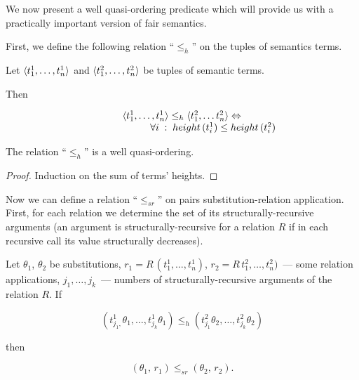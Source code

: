 We now present a well quasi-ordering predicate which will provide us with a practically important version of fair semantics. 


First, we define the following relation ``$\leq_h$'' on the tuples of semantics terms.

\begin{definition}
  Let $\langle t_1^1, \dots, t_n^1 \rangle$ and $\langle t_1^2, \dots, t_n^2 \rangle$ be tuples of semantic terms. 

  Then

  \[
  \begin{array}{c}
  \langle t_1^1, \ldots, t_n^1 \rangle \leq_h \langle t_1^2, \ldots t_n^2 \rangle \Leftrightarrow\\
  \phantom{XXXXXXX}\forall i\;:\;height\,(t_i^1) \leq height\,(t_i^2)
  \end{array}
  \]
\end{definition}


\begin{lemma}
\label{lemma:wqo1}
The relation ``$\leq_h$'' is a well quasi-ordering.
\end{lemma}
\begin{proof}
  Induction on the sum of terms' heights.
\end{proof}

Now we can define a relation ``$\leq_{sr}$'' on pairs substitution-relation application. First, for each relation we
determine the set of its structurally-recursive arguments (an argument is structurally-recursive for a relation $R$ if in
each recursive call its value structurally decreases). 

\begin{definition}
  Let $\theta_1$, $\theta_2$ be substitutions, \mbox{$r_1=R\,(t^1_1,\dots,t^1_n)$}, \mbox{$r_2=R\,t^2_1,\dots,t^2_n)$}~--- some relation applications, $j_1, \dots, j_k$~---
  numbers of structurally-recursive arguments of the relation $R$. If

  \[
  (t^1_{j_1,}\theta_1,  \dots,  t^1_{j_k}\theta_1) \leq_h (t^2_{j_1}\theta_2, \dots, t^2_{j_k}\theta_2)
  \]

  then
  
  \[
  (\theta_1,\, r_1) \leq_{sr} (\theta_2,\, r_2).
  \]
\end{definition}

